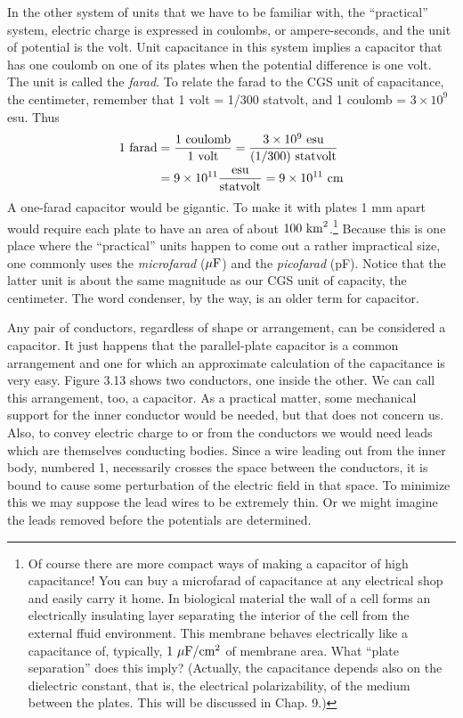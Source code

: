 In the other system of units that we have to be familiar with, the
``practical'' system, electric charge is expressed in coulombs, or
ampere-seconds, and the unit of potential is the volt. Unit capacitance
in this system implies a capacitor that has one coulomb on
one of its plates when the potential difference is one volt. The unit
is called the \emph{farad}. To relate the farad to the CGS unit of capacitance,
the centimeter, remember that 1 volt = 1/300 statvolt, and
1 coulomb = $3 \times 10^9$ esu. Thus
\begin{align*}
  1\ \textup{farad} &= \frac{1\ \textup{coulomb}}{1\ \textup{volt}} = \frac{3 \times 10^9\ \textup{esu}}{(1/300)\ \textup{statvolt}} \\
                &= 9\times 10^{11}\frac{\textup{esu}}{\textup{statvolt}} = 9\times 10^{11}\ \textup{cm}
\end{align*}
A one-farad capacitor would be gigantic. To make it with plates
1 mm apart would require each plate to have an area of about
$100\ \textup{km}^2$.\footnote{Of course there are more compact ways of making a capacitor of high capacitance!
You can buy a microfarad of capacitance at any electrical shop and easily carry it home.
In biological material the wall of a cell forms an electrically insulating layer separating
the interior of the cell from the external ffuid environment. This membrane behaves
electrically like a capacitance of, typically, $1\ \mu\textup{F}/\textup{cm}^2$ of membrane area. What ``plate
separation'' does this imply? (Actually, the capacitance depends also on the dielectric
constant, that is, the electrical polarizability, of the medium between the plates. This
will be discussed in Chap. 9.)}
Because this is one place where the ``practical'' units
happen to come out a rather impractical size, one commonly uses
the \emph{microfarad} ($\mu\textup{F}$) and the
\emph{picofarad} (pF).
Notice
that the latter unit is about the same magnitude as our CGS unit of capacity, the
centimeter. The word condenser, by the way, is an older term for
capacitor.

Any pair of conductors, regardless of shape or arrangement, can
be considered a capacitor. It just happens that the parallel-plate
capacitor is a common arrangement and one for which an approximate
calculation of the capacitance is very easy. Figure 3.13 shows
two conductors, one inside the other. We can call this arrangement,
too, a capacitor. As a practical matter, some mechanical support
for the inner conductor would be needed, but that does not concern
us. Also, to convey electric charge to or from the conductors we
would need leads which are themselves conducting bodies. Since
a wire leading out from the inner body, numbered 1, necessarily
crosses the space between the conductors, it is bound to cause some
perturbation of the electric field in that space. To minimize this we
may suppose the lead wires to be extremely thin. Or we might
imagine the leads removed before the potentials are determined.

